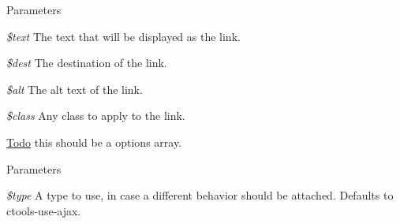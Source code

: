 \begin{DoxyParams}{Parameters}
\item[{\em \$text}]The text that will be displayed as the link. \item[{\em \$dest}]The destination of the link. \item[{\em \$alt}]The alt text of the link. \item[{\em \$class}]Any class to apply to the link. \end{DoxyParams}
\begin{Desc}
\item[\hyperlink{todo__todo000005}{Todo}]this should be a options array. \end{Desc}

\begin{DoxyParams}{Parameters}
\item[{\em \$type}]A type to use, in case a different behavior should be attached. Defaults to ctools-\/use-\/ajax. \end{DoxyParams}
